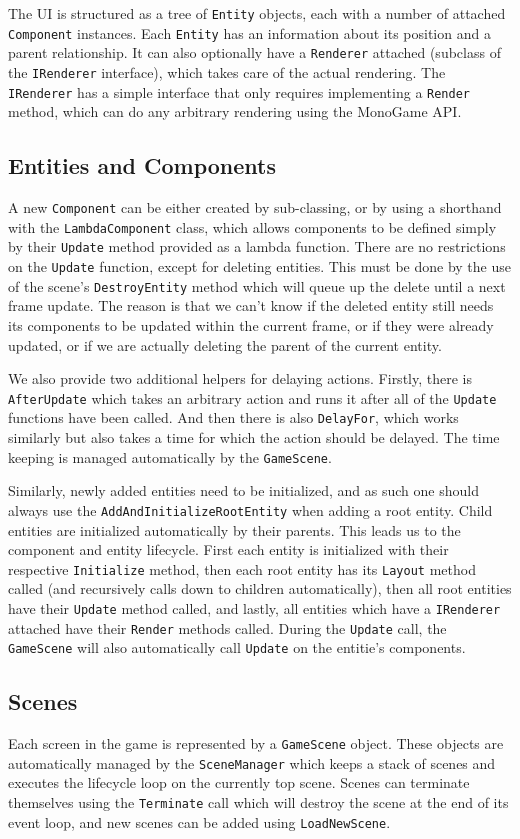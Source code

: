 The UI is structured as a tree of \verb|Entity| objects, each with a number of attached \verb|Component| instances. Each \verb|Entity| has an information about its position and a parent relationship. It can also optionally have a \verb|Renderer| attached (subclass of the \verb|IRenderer| interface), which takes care of the actual rendering. The \verb|IRenderer| has a simple interface that only requires implementing a \verb|Render| method, which can do any arbitrary rendering using the MonoGame \citep{monogame} API.

\subsection{Entities and Components}

A new \verb|Component| can be either created by sub-classing, or by using a shorthand with the \verb|LambdaComponent| class, which allows components to be defined simply by their \verb|Update| method provided as a lambda function. There are no restrictions on the \verb|Update| function, except for deleting entities. This must be done by the use of the scene's \verb|DestroyEntity| method which will queue up the delete until a next frame update. The reason is that we can't know if the deleted entity still needs its components to be updated within the current frame, or if they were already updated, or if we are actually deleting the parent of the current entity.

We also provide two additional helpers for delaying actions. Firstly, there is \verb|AfterUpdate| which takes an arbitrary action and runs it after all of the \verb|Update| functions have been called. And then there is also \verb|DelayFor|, which works similarly but also takes a time for which the action should be delayed. The time keeping is managed automatically by the \verb|GameScene|.

Similarly, newly added entities need to be initialized, and as such one should always use the \verb|AddAndInitializeRootEntity| when adding a root entity. Child entities are initialized automatically by their parents. This leads us to the component and entity lifecycle. First each entity is initialized with their respective \verb|Initialize| method, then each root entity has its \verb|Layout| method called (and recursively calls down to children automatically), then all root entities have their \verb|Update| method called, and lastly, all entities which have a \verb|IRenderer| attached have their \verb|Render| methods called. During the \verb|Update| call, the \verb|GameScene| will also automatically call \verb|Update| on the entitie's components.

\subsection{Scenes}

Each screen in the game is represented by a \verb|GameScene| object. These objects are automatically managed by the \verb|SceneManager| which keeps a stack of scenes and executes the lifecycle loop on the currently top scene. Scenes can terminate themselves using the \verb|Terminate| call which will destroy the scene at the end of its event loop, and new scenes can be added using \verb|LoadNewScene|.